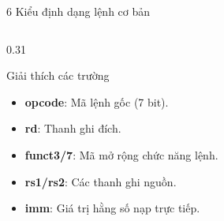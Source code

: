 \begin{frame}{6 Kiểu định dạng lệnh cơ bản}
\begin{columns}
        \begin{column}{0.31\textwidth}
            \footnotesize
            \begin{block}{Giải thích các trường}
                \begin{itemize}
                    \item \textcolor{red!80!black}{\textbf{opcode}:} Mã lệnh gốc (7 bit).
                    \item \textcolor{blue!80!black}{\textbf{rd}:} Thanh ghi đích.
                    \item \textcolor{green!60!black}{\textbf{funct3/7}:} Mã mở rộng chức năng lệnh.
                    \item \textcolor{orange!80!black}{\textbf{rs1/rs2}:} Các thanh ghi nguồn.
                    \item \textcolor{purple!80!black}{\textbf{imm}:} Giá trị hằng số nạp trực tiếp.
                \end{itemize}
            \end{block}
        \end{column}
    \end{columns}
\end{frame}

